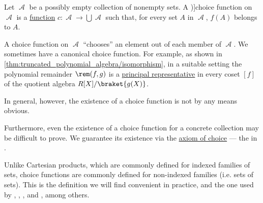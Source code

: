\begin{definition}\label{def:choice_function}
  Let \( \mscrA \) be a possibly empty collection of nonempty sets. A \term[ru=функция выбора (\cite[136]{Герасимов2014Вычислимость})]{choice function} on \( \mscrA \) is a \hyperref[def:function]{function} \( c: \mscrA \to \bigcup \mscrA \) such that, for every set \( A \) in \( \mscrA \), \( f(A) \) belongs to \( A \).
\end{definition}
\begin{comments}
  \item A choice function on \( \mscrA \) \enquote{chooses} an element out of each member of \( \mscrA \). We sometimes have a canonical choice function. For example, as shown in \cref{thm:truncated_polynomial_algebra/isomorphism}, in a suitable setting the polynomial remainder \( \rem(f, g) \) is a \hyperref[def:quotient_polynomial_algebra_as_truncated]{principal representative} in every coset \( [f] \) of the quotient algebra \( R[X] / \braket{ g(X) } \).

  In general, however, the existence of a choice function is not by any means obvious.

  \item Furthermore, even the existence of a choice function for a concrete collection may be difficult to prove. We guarantee its existence via the \hyperref[def:zfc/choice]{axiom of choice} --- the  in .

  \item Unlike Cartesian products, which are commonly defined for indexed families of sets, choice functions are commonly defined for non-indexed families (i.e. sets of sets). This is the definition we will find convenient in practice, and the one used by
  \textcite[def. 6.4.1]{Hinman2005Logic},
  \textcite[59; 60]{Halmos1960NaiveSetTheory},
  \textcite[thm. 6M(3)]{Enderton1977SetTheory},
  \textcite[def. 0.3.4]{Harzheim2005OrderedSets} and
  \textcite[136]{Герасимов2014Вычислимость},
  among others.
\end{comments}

